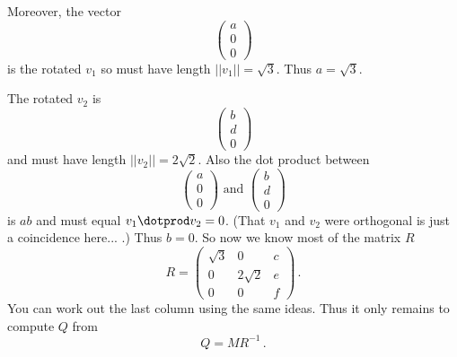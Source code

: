{Moreover, the vector 
$$
\begin{pmatrix}
a \\ 0 \\ 0
\end{pmatrix}
$$
is the rotated $v_1$ so must have length $||v_1|| = \sqrt{3}$. Thus $a= \sqrt{3}$. 

The rotated $v_2$ is
$$
\begin{pmatrix}
b \\ d \\ 0
\end{pmatrix}
$$
and must have length $||v_2||=2\sqrt{2}$. Also the dot product between  
$$
\begin{pmatrix}
a \\ 0 \\ 0
\end{pmatrix}
\mbox{ and }
\begin{pmatrix}
b \\ d \\ 0
\end{pmatrix}
$$
is $ab$ and
must equal $v_1\dotprod v_2=0$. (That $v_1$ and $v_2$ were orthogonal is just a coincidence here... .) Thus $b=0$.
So now we know most of the matrix $R$
$$
R=\begin{pmatrix}\sqrt{3} & 0 & c \\ 0 & 2\sqrt{2} & e \\ 0  & 0 & f\end{pmatrix}\, .
$$
You can work out the last column using the same ideas. Thus it only remains to compute $Q$ from
$$
Q=M R^{-1}\, .
$$

 
}

